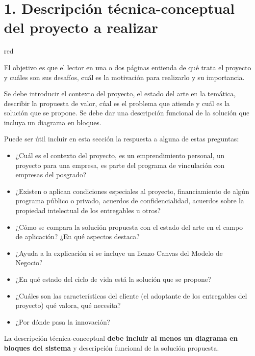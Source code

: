 \documentclass[
11pt, %
codirector, %
]{charter}
\begin{document}
\section{1. Descripción técnica-conceptual del proyecto a realizar}
\label{sec:descripcion}


\begin{consigna}{red} %

El objetivo es que el lector en una o dos páginas entienda de qué trata el proyecto y cuáles son sus desafíos, cuál es la motivación para realizarlo y su importancia.

Se debe introducir el contexto del proyecto, el estado del arte en la temática, describir la propuesta de valor, cúal es el problema que atiende y cuál es la solución que se propone. Se debe dar una descripción funcional de la solución que incluya un diagrama en bloques.

Puede ser útil incluir en esta sección la respuesta a alguna de estas preguntas:

\begin{itemize}
	\item ¿Cuál es el contexto del proyecto, es un emprendimiento personal, un proyecto para una empresa, es parte del programa de vinculación con empresas del posgrado?
	\item ¿Existen o aplican condiciones especiales al proyecto, financiamiento de algún programa público o privado, acuerdos de confidencialidad, acuerdos sobre la propiedad intelectual de los entregables u otros?
	\item ¿Cómo se compara la solución propuesta con el estado del arte en el campo de aplicación? ¿En qué aspectos destaca?
	\item ¿Ayuda a la explicación si se incluye un lienzo Canvas del Modelo de Negocio?
	\item ¿En qué estado del ciclo de vida está la solución que se propone?
	\item ¿Cuáles son las características del cliente (el adoptante de los entregables del proyecto) qué valora, qué necesita?
	\item ¿Por dónde pasa la innovación?
\end{itemize}

La descripción técnica-conceptual \textbf{debe incluir al menos un diagrama en bloques del sistema} y descripción funcional de la solución propuesta.


\end{consigna}
\end{document}
